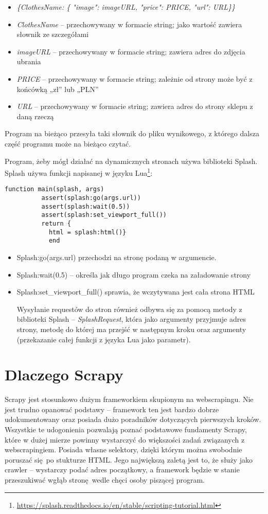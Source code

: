 \begin{itemize}
\item[] \emph{\{ClothesName: \{ "image": imageURL, "price": PRICE, "url": URL\}\}}
\item[] \emph{ClothesName} – przechowywany w formacie string; jako wartość zawiera słownik ze szczegółami
\item[] \emph{imageURL} – przechowywany w formacie string; zawiera adres do zdjęcia ubrania
\item[] \emph{PRICE} – przechowywany w formacie string; zależnie od strony może być z końcówką „zł” lub „PLN”
\item[] \emph{URL} – przechowywany w formacie string; zawiera adres do strony sklepu z daną rzeczą
\end{itemize}
Program na bieżąco przesyła taki słownik do pliku wynikowego, z którego dalsza część programu może na bieżąco czytać.


Program, żeby mógł działać na dynamicznych stronach używa biblioteki Splash.
Splash używa funkcji napisanej w języku Lua\footnote{\url{https://splash.readthedocs.io/en/stable/scripting-tutorial.html}}:
\begin{lstlisting}
function main(splash, args)
          assert(splash:go(args.url))
          assert(splash:wait(0.5))
          assert(splash:set_viewport_full())
          return {
            html = splash:html()}
            end
\end{lstlisting}

\begin{itemize}
\item[] Splash:go(args.url) przechodzi na stronę podaną w argumencie.
\item[] Splash:wait(0.5) – określa jak długo program czeka na załadowanie strony
\item[] Splash:set\_viewport\_full() sprawia, że wczytywana jest cała strona HTML

Wysyłanie requestów do stron również odbywa się za pomocą metody z biblioteki Splash -- \emph{SplashRequest}, która jako argumenty przyjmuje adres strony, metodę do której ma przejść w następnym kroku oraz argumenty (przekazanie całej funkcji z języka Lua jako parametr).
\end{itemize}
\section{Dlaczego Scrapy}

Scrapy jest stosunkowo dużym frameworkiem skupionym na webscrapingu. Nie jest trudno opanować podstawy -- framework ten jest bardzo dobrze udokumentowany oraz posiada dużo poradników dotyczących pierwszych kroków. Wszystkie te udogonienia pozwalają poznać podstawowe fundamenty Scrapy, które w dużej mierze powinny wystarczyć do większości zadań związanych z webscrapingiem. Posiada własne selektory, dzięki którym można swobodnie poruszać się po stukturze HTML. Jego największą zaletą jest to, że służy jako crawler -- wystarczy podać adres początkowy, a framework będzie w stanie przeszukiwać wgłąb stronę wedle chęci osoby piszącej program.


